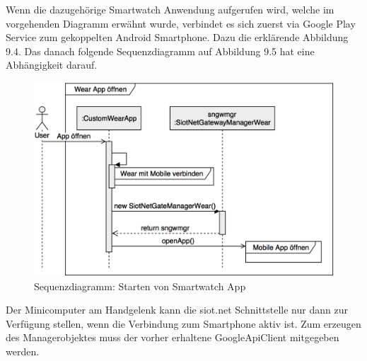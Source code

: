 Wenn die dazugehörige Smartwatch Anwendung aufgerufen wird, welche im vorgehenden Diagramm erwähnt wurde, verbindet es sich zuerst via Google Play Service zum gekoppelten Android Smartphone. Dazu die erklärende Abbildung 9.4. Das danach folgende Sequenzdiagramm auf Abbildung 9.5 hat eine Abhängigkeit darauf.
\begin{figure}[H]
  \centering
  \includegraphics[scale=0.28]{98_Bilder/09_Konzept/03_SequenzdiagrammOpenAppSiotNetGatewayLibrary}
  \caption[siot.net Gateway Library Sequenzdiagramm App starten 3]{Sequenzdiagramm: Starten von Smartwatch App}
\end{figure}
Der Minicomputer am Handgelenk kann die siot.net Schnittstelle nur dann zur Verfügung stellen, wenn die Verbindung zum Smartphone aktiv ist. Zum erzeugen des Managerobjektes muss der vorher erhaltene GoogleApiClient mitgegeben werden.
